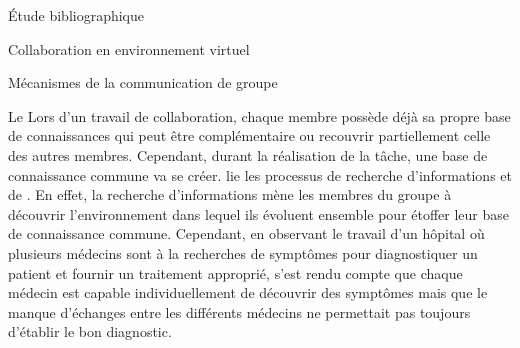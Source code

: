 \documentclass[myfrancais,ngerman,english,french]{mythesis}
\begin{document}
\begin{mychapter}{Étude bibliographique}
\begin{mysection}{Collaboration en environnement virtuel}
\begin{mysubsection}{Mécanismes de la communication de groupe}
\begin{mysubsubsection}{Le \mygrounding}
					Lors d'un travail de collaboration, chaque membre possède déjà sa propre base de connaissances qui peut être complémentaire ou recouvrir partiellement celle des autres membres.
					Cependant, durant la réalisation de la tâche, une base de connaissance commune va se créer.
					 lie les processus de recherche d'informations et de \mygrounding.
					En effet, la recherche d'informations mène les membres du groupe à découvrir l'environnement dans lequel ils évoluent ensemble pour étoffer leur base de connaissance commune.
					Cependant, en observant le travail d'un hôpital où plusieurs médecins sont à la recherches de symptômes pour diagnostiquer un patient et fournir un traitement approprié,  s'est rendu compte que chaque médecin est capable individuellement de découvrir des symptômes mais que le manque d'échanges entre les différents médecins ne permettait pas toujours d'établir le bon diagnostic.


\end{mysubsubsection}
\end{mysubsection}
\end{mysection}
\end{mychapter}
\end{document}
